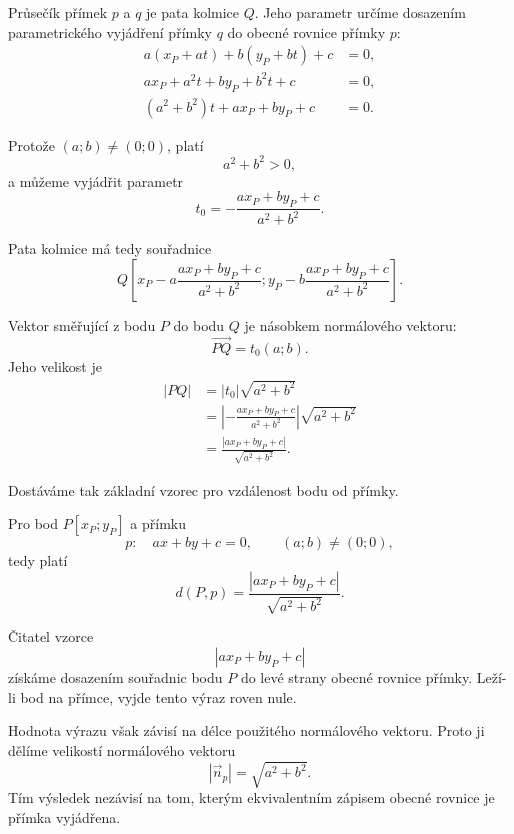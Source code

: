 Průsečík přímek $p$ a $q$ je pata kolmice $Q$. Jeho parametr určíme
dosazením parametrického vyjádření přímky $q$ do obecné rovnice
přímky $p$:
\begin{align*}
    a(x_P+at)+b(y_P+bt)+c&=0,\\
    ax_P+a^2t+by_P+b^2t+c&=0,\\
    (a^2+b^2)t+ax_P+by_P+c&=0.
\end{align*}

Protože $(a;b)\neq(0;0)$, platí
\[
    a^2+b^2>0,
\]
a můžeme vyjádřit parametr
\begin{equation}\label{eq:Parameter_foot_point_line}
    t_0
    =
    -\frac{ax_P+by_P+c}{a^2+b^2}.
\end{equation}

Pata kolmice má tedy souřadnice
\begin{equation}\label{eq:Foot_point_general_line}
    Q\left[
        x_P-a\frac{ax_P+by_P+c}{a^2+b^2};
        y_P-b\frac{ax_P+by_P+c}{a^2+b^2}
    \right].
\end{equation}

Vektor směřující z bodu $P$ do bodu $Q$ je násobkem normálového
vektoru:
\[
    \overrightarrow{PQ}
    =
    t_0(a;b).
\]
Jeho velikost je
\begin{align*}
    |PQ|
    &=
    |t_0|\sqrt{a^2+b^2}\\
    &=
    \left|
        -\frac{ax_P+by_P+c}{a^2+b^2}
    \right|
    \sqrt{a^2+b^2}\\
    &=
    \frac{|ax_P+by_P+c|}{\sqrt{a^2+b^2}}.
\end{align*}

Dostáváme tak základní vzorec pro vzdálenost bodu od přímky.

Pro bod $P[x_P;y_P]$ a přímku
\[
    p:\quad ax+by+c=0,
    \qquad
    (a;b)\neq(0;0),
\]
tedy platí
\begin{equation}\label{eq:Distance_point_general_line}
    d(P,p)
    =
    \frac{|ax_P+by_P+c|}{\sqrt{a^2+b^2}}.
\end{equation}

\begin{remark}\label{rem:Meaning_distance_formula_parts}
    Čitatel vzorce
    \[
        |ax_P+by_P+c|
    \]
    získáme dosazením souřadnic bodu $P$ do levé strany obecné
    rovnice přímky. Leží-li bod na přímce, vyjde tento výraz roven
    nule.

    Hodnota výrazu však závisí na délce použitého normálového vektoru.
    Proto ji dělíme velikostí normálového vektoru
    \[
        |\vec{n}_p|=\sqrt{a^2+b^2}.
    \]
    Tím výsledek nezávisí na tom, kterým ekvivalentním zápisem obecné
    rovnice je přímka vyjádřena.
\end{remark}

